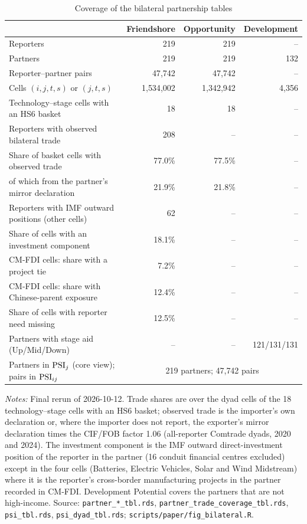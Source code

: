 \begin{table}[t]
\centering
\begin{threeparttable}
\caption{Coverage of the bilateral partnership tables}
\label{tab:bilateral_coverage}
\footnotesize
\begin{tabular}{@{}l r r r@{}}
\toprule
 & Friendshore & Opportunity & Development\\
\midrule
Reporters & 219 & 219 & --\\
Partners & 219 & 219 & 132\\
Reporter--partner pairs & 47{,}742 & 47{,}742 & --\\
Cells $(i,j,t,s)$ or $(j,t,s)$ & 1{,}534{,}002 & 1{,}342{,}942 & 4{,}356\\
Technology--stage cells with an HS6 basket & 18 & 18 & --\\
Reporters with observed bilateral trade & 208 & -- & --\\
Share of basket cells with observed trade & 77.0\% & 77.5\% & --\\
\quad of which from the partner's mirror declaration & 21.9\% & 21.8\% & --\\
Reporters with IMF outward positions (other cells) & 62 & -- & --\\
Share of cells with an investment component & 18.1\% & -- & --\\
\quad CM-FDI cells: share with a project tie & 7.2\% & -- & --\\
\quad CM-FDI cells: share with Chinese-parent exposure & 12.4\% & -- & --\\
Share of cells with reporter need missing & 12.5\% & -- & --\\
Partners with stage aid (Up/Mid/Down) & -- & -- & 121/131/131\\
Partners in $\mathrm{PSI}_j$ (core view); pairs in $\mathrm{PSI}_{ij}$ & \multicolumn{3}{c}{219 partners; 47{,}742 pairs}\\
\bottomrule
\end{tabular}
\begin{tablenotes}[flushleft]\footnotesize
\item \textit{Notes:} Final rerun of 2026-10-12. Trade shares are over the dyad cells of the 18 technology--stage cells with an HS6 basket; observed trade is the importer's own declaration or, where the importer does not report, the exporter's mirror declaration times the CIF/FOB factor 1.06 (all-reporter Comtrade dyads, 2020 and 2024). The investment component is the IMF outward direct-investment position of the reporter in the partner (16 conduit financial centres excluded) except in the four cells (Batteries, Electric Vehicles, Solar and Wind Midstream) where it is the reporter's cross-border manufacturing projects in the partner recorded in CM-FDI. Development Potential covers the partners that are not high-income. Source: \texttt{partner\_*\_tbl.rds}, \texttt{partner\_trade\_coverage\_tbl.rds}, \texttt{psi\_tbl.rds}, \texttt{psi\_dyad\_tbl.rds}; \texttt{scripts/paper/fig\_bilateral.R}.
\end{tablenotes}
\end{threeparttable}
\end{table}
